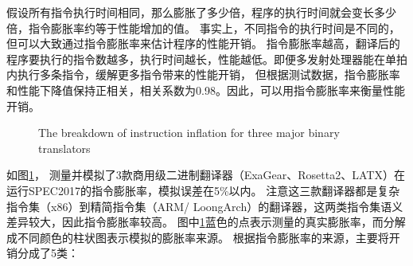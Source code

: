 假设所有指令执行时间相同，那么膨胀了多少倍，程序的执行时间就会变长多少倍，指令膨胀率约等于性能增加的值。
事实上，不同指令的执行时间是不同的，但可以大致通过指令膨胀率来估计程序的性能开销。
指令膨胀率越高，翻译后的程序要执行的指令数越多，执行时间越长，性能越低。即便多发射处理器能在单拍内执行多条指令，缓解更多指令带来的性能开销，
但根据测试数据，指令膨胀率和性能下降值保持正相关，相关系数为0.98\cite{deflater}。因此，可以用指令膨胀率来衡量性能开销。


\begin{figure}[!htbp]
  \centering
      {\enspace The breakdown of instruction inflation for three major binary translators}
  \label{img:insts_inflt_breakdown_2017}
\end{figure}

如图\ref{img:insts_inflt_breakdown_2017}，
测量并模拟了3款商用级二进制翻译器（ExaGear、Rosetta2、LATX）在运行SPEC2017的指令膨胀率，模拟误差在5\%以内。
注意这三款翻译器都是复杂指令集（x86）到精简指令集（ARM/ LoongArch）的翻译器，这两类指令集语义差异较大，因此指令膨胀率较高。
图中\ref{img:insts_inflt_breakdown_2017}蓝色的点表示测量的真实膨胀率，而分解成不同颜色的柱状图表示模拟的膨胀率来源。
根据指令膨胀率的来源，主要将开销分成了5类：


